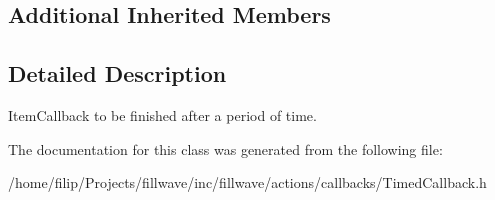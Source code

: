 \subsection*{Additional Inherited Members}


\subsection{Detailed Description}
Item\+Callback to be finished after a period of time. 

The documentation for this class was generated from the following file\+:\begin{DoxyCompactItemize}
\item 
/home/filip/\+Projects/fillwave/inc/fillwave/actions/callbacks/Timed\+Callback.\+h\end{DoxyCompactItemize}
